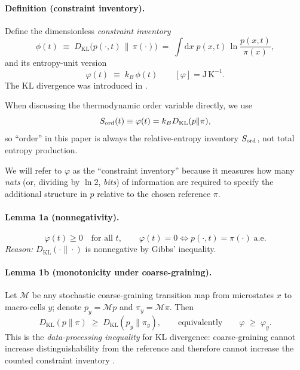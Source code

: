 \documentclass[10pt]{article}
\providecommand{\dd}{\mathrm{d}}
\begin{document}
\paragraph{Definition (constraint inventory).}
Define the dimensionless \emph{constraint inventory}
\begin{equation}
\phi(t) \;\equiv\; D_{\mathrm{KL}}\!\bigl(p(\cdot,t)\,\|\,\pi(\cdot)\bigr)
\;=\;
\int \! \dd x\; p(x,t)\,\ln\!\frac{p(x,t)}{\pi(x)},
\label{eq:phi_def}
\end{equation}
and its entropy-unit version
\begin{equation}
\varphi(t) \;\equiv\; k_B\,\phi(t)
\qquad [\varphi]=\mathrm{J\,K^{-1}}.
\label{eq:varphi_def}
\end{equation}
The KL divergence was introduced in \cite{KullbackLeibler1951}.

When discussing the thermodynamic order variable directly, we use
\begin{equation}
S_{\rm ord}(t) \equiv \varphi(t)=k_B D_{\mathrm{KL}}(p\|\pi),
\label{eq:Sord_def_main}
\end{equation}
so ``order'' in this paper is always the relative-entropy inventory $S_{\rm ord}$, not total entropy production.

We will refer to $\varphi$ as the ``constraint inventory'' because it measures how many
\emph{nats} (or, dividing by $\ln 2$, \emph{bits}) of information are required to specify the
additional structure in $p$ relative to the chosen reference $\pi$.

\paragraph{Lemma 1a (nonnegativity).}
\begin{equation}
\varphi(t)\ge 0 \quad \text{for all }t,\qquad
\varphi(t)=0 \iff p(\cdot,t)=\pi(\cdot)\;\text{a.e.}
\label{eq:phi_nonneg}
\end{equation}
\emph{Reason:} $D_{\mathrm{KL}}(\cdot\|\cdot)$ is nonnegative by Gibbs' inequality.

\paragraph{Lemma 1b (monotonicity under coarse-graining).}
Let $\mathcal{M}$ be any stochastic coarse-graining transition map from microstates $x$ to
macro-cells $y$; denote $p_y=\mathcal{M}p$ and $\pi_y=\mathcal{M}\pi$. Then
\begin{equation}
D_{\mathrm{KL}}(p\|\pi) \;\ge\; D_{\mathrm{KL}}(p_y\|\pi_y),
\qquad\text{equivalently}\qquad
\varphi \;\ge\; \varphi_y.
\label{eq:data_processing}
\end{equation}
This is the \emph{data-processing inequality} for KL divergence: coarse-graining cannot increase
distinguishability from the reference and therefore cannot increase the counted constraint
inventory \cite{CoverThomas2006}.
\end{document}
